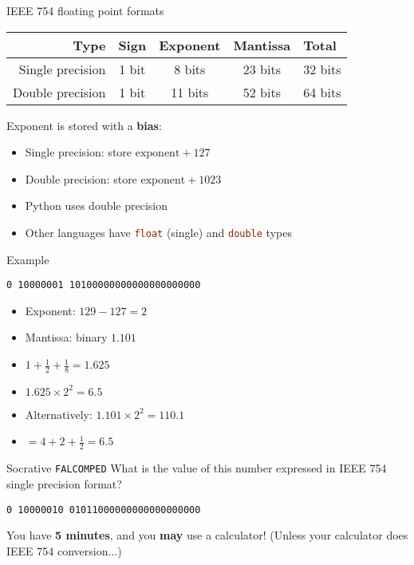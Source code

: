 \begin{frame}[fragile]{IEEE 754 floating point formats}
	\begin{center}
		\begin{tabular}{|r|ccc|l|}
			\hline
			Type & Sign & Exponent & Mantissa & Total \\\hline
			Single precision & 1 bit & 8 bits & 23 bits & 32 bits \\\hline
			Double precision & 1 bit & 11 bits & 52 bits & 64 bits \\\hline
		\end{tabular}
	\end{center}
	\pause
	Exponent is stored with a \textbf{bias}:
	\begin{itemize}
		\item Single precision: store $\text{exponent} + 127$
		\item Double precision: store $\text{exponent} + 1023$
	\end{itemize}
	\begin{itemize}
		\pause\item Python uses double precision
		\pause\item Other languages have \lstinline[language=C]{float} (single) and \lstinline[language=C]{double} types
	\end{itemize}
\end{frame}

\begin{frame}{Example}
	\pause
	\begin{center}
		\texttt{0 10000001 10100000000000000000000}
	\end{center}
	\begin{itemize}
		\pause\item Exponent: $129 - 127 = 2$
		\pause\item Mantissa: binary $1.101$
		\pause\item $1 + \frac12 + \frac18 = 1.625$
		\pause\item $1.625 \times 2^2 = 6.5$
		\pause\item Alternatively: $1.101 \times 2^2 = 110.1$
		\pause\item $= 4 + 2 + \frac12 = 6.5$
	\end{itemize}
\end{frame}

\begin{frame}{Socrative \texttt{FALCOMPED}}
	\pause
	What is the value of this number expressed in IEEE 754 single precision format?
	\begin{center}
		\texttt{0 10000010 01011000000000000000000}
	\end{center}
	You have \textbf{5 minutes}, and you \textbf{may} use a calculator!
	(Unless your calculator does IEEE 754 conversion...)
\end{frame}


